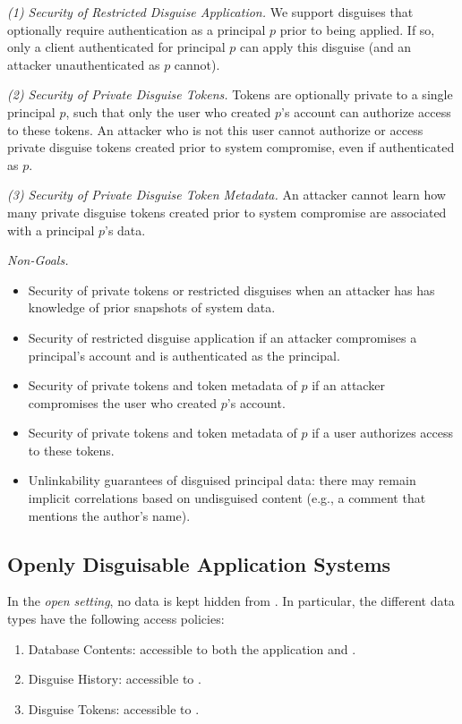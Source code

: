 \vspace{6pt}\noindent\emph{(1) Security of Restricted Disguise Application.}
We support disguises that optionally require authentication as a principal $p$ prior to being
applied. If so, only a client authenticated for principal $p$ can apply this disguise (and an
attacker unauthenticated as $p$ cannot).

\vspace{6pt}\noindent\emph{(2) Security of Private Disguise Tokens.} 
Tokens are optionally private to a single principal $p$, such that only the user who created
$p$'s account can authorize access to these tokens. An attacker who is not this user cannot
authorize or access private disguise tokens created prior to system compromise, even if authenticated as $p$.

\vspace{6pt}\noindent\emph{(3) Security of Private Disguise Token Metadata.}
An attacker cannot learn how many private disguise tokens created prior to system compromise are associated with a principal $p$'s data.

\vspace{6pt}\noindent\emph{Non-Goals.}
\begin{itemize}
    \item Security of private tokens or restricted disguises when an attacker has has knowledge of prior snapshots of system data.
    \item Security of restricted disguise application if an attacker compromises a principal's account
        and is authenticated as the principal.
    \item Security of private tokens and token metadata of $p$ if an attacker compromises the user
        who created $p$'s account.
    \item Security of private tokens and token metadata of $p$ if a user authorizes access to these
        tokens.
    \item Unlinkability guarantees of disguised principal data: there may remain implicit
        correlations based on undisguised content (e.g., a comment that mentions the author’s name).
\end{itemize}


\subsection{Openly Disguisable Application Systems}
In the \emph{open setting}, no data is kept hidden from \sys. In particular, the different data
types have the following access policies:
\begin{enumerate}
    \item Database Contents: accessible to both the application and \sys.
    \item Disguise History: accessible to \sys.
    \item Disguise Tokens: accessible to \sys.
\end{enumerate}
